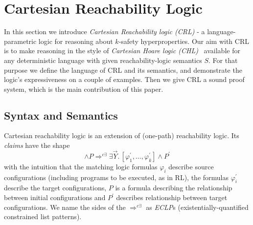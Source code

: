 \section{Cartesian Reachability Logic}
In this section we introduce \emph{Cartesian Reachability logic (CRL)} - a language-parametric logic for reasoning
about $k$-safety hyperproperties.
Our aim with CRL is to make reasoning in the style of \emph{Cartesian Hoare logic (CHL)}~\cite{SousaD16} available for any
deterministic language with given reachability-logic semantics $S$.
For that purpose we define the language of CRL and its semantics, and demonstrate the logic's expressiveness
on a couple of examples.
Then we give CRL a sound proof system, which is the main contribution of this paper.


\subsection{Syntax and Semantics}

Cartesian reachability logic is an extension of (one-path) reachability logic.
Its \emph{claims} have the shape
\begin{equation*}
  [\varphi_1,\ldots,\varphi_k] \land P
  \Rightarrow^{c\exists} \exists \vec{Y}.\, [\varphi^\prime_1,\ldots,\varphi^\prime_k] \land P^\prime
\end{equation*}
with the intuition that the matching logic formulas $\varphi_i$ describe source configurations
(including programs to be executed, as in RL),
the formulas $\varphi_i^\prime$ describe the target configurations,
$P$ is a formula describing the relationship between initial configurations
and $P^\prime$ describes relationship between target configurations.
We name the sides of the $\Rightarrow^{c\exists}$ as \emph{ECLP}s
(existentially-quantified constrained list patterns). 


